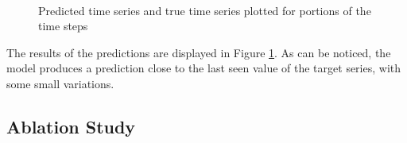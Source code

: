 \documentclass{article}
\begin{document}
\begin{figure}
  \centering
   \\
  \caption{Predicted time series and true time series plotted for portions of the time steps}
  \label{fig:res}
\end{figure}

The results of the predictions are displayed in Figure \ref{fig:res}. As can be noticed,
the model produces a prediction close to the last seen value of the target series, with
some small variations.

\subsection{Ablation Study}
\end{document}
